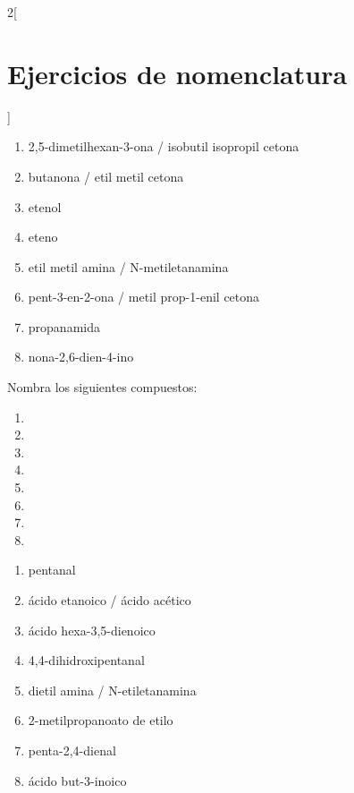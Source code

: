 \documentclass[10pt]{article}
\begin{document}
\begin{multicols}{2}[
  \section{Ejercicios de nomenclatura}
  ]
\begin{solution}
  \begin{enumerate}
    \item 2,5-dimetilhexan-3-ona / isobutil isopropil cetona
    \item butanona / etil metil cetona
    \item etenol
    \item eteno
    \item etil metil amina / N-metiletanamina
    \item pent-3-en-2-ona / metil prop-1-enil cetona
    \item propanamida
    \item nona-2,6-dien-4-ino
  \end{enumerate}
\end{solution}

\begin{exercise}[
    tags    = {orgánica,formulación,múltiple,2B},
    topics  = {química orgánica,formulación,nomenclatura},
    source  = {Química 2B SAN 2016, p391, e14},
  ]
  Nombra los siguientes compuestos:

  \begin{enumerate}
    \item {}
    \item {}
    \item {}
    \item {}
    \item {}
    \item {}
    \item {}
    \item {}
  \end{enumerate}
\end{exercise}

\begin{solution}
  \begin{enumerate}
    \item pentanal
    \item ácido etanoico / ácido acético
    \item ácido hexa-3,5-dienoico
    \item 4,4-dihidroxipentanal
    \item dietil amina / N-etiletanamina
    \item 2-metilpropanoato de etilo
    \item penta-2,4-dienal
    \item ácido but-3-inoico
  \end{enumerate}
\end{solution}



\end{multicols}
\end{document}
